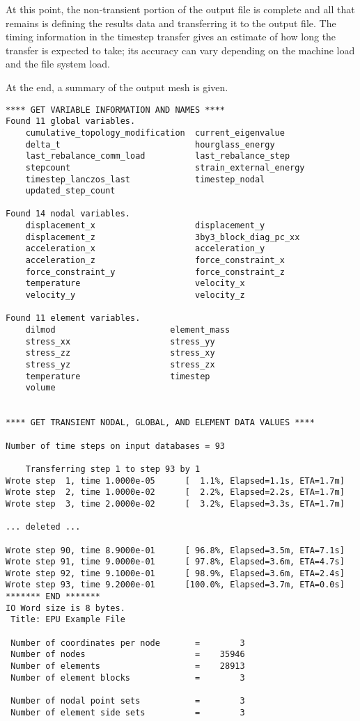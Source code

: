 \sectionline
At this point, the non-transient portion of the output file is
complete and all that remains is defining the results data and
transferring it to the output file.  The timing information in the
timestep transfer gives an estimate of how long the transfer is
expected to take; its accuracy can vary depending on the machine load
and the file system load.

At the end, a summary of the output mesh is given.

\begin{verbatim}
**** GET VARIABLE INFORMATION AND NAMES ****
Found 11 global variables.
	cumulative_topology_modification  current_eigenvalue
	delta_t                           hourglass_energy
	last_rebalance_comm_load          last_rebalance_step
	stepcount                         strain_external_energy
	timestep_lanczos_last             timestep_nodal
	updated_step_count

Found 14 nodal variables.
	displacement_x                    displacement_y
	displacement_z                    3by3_block_diag_pc_xx
	acceleration_x                    acceleration_y
	acceleration_z                    force_constraint_x
	force_constraint_y                force_constraint_z
	temperature                       velocity_x
	velocity_y                        velocity_z

Found 11 element variables.
	dilmod                       element_mass
	stress_xx                    stress_yy
	stress_zz                    stress_xy
	stress_yz                    stress_zx
	temperature                  timestep
	volume


**** GET TRANSIENT NODAL, GLOBAL, AND ELEMENT DATA VALUES ****

Number of time steps on input databases = 93

	Transferring step 1 to step 93 by 1
Wrote step  1, time 1.0000e-05		[  1.1%, Elapsed=1.1s, ETA=1.7m]
Wrote step  2, time 1.0000e-02		[  2.2%, Elapsed=2.2s, ETA=1.7m]
Wrote step  3, time 2.0000e-02		[  3.2%, Elapsed=3.3s, ETA=1.7m]

... deleted ...

Wrote step 90, time 8.9000e-01		[ 96.8%, Elapsed=3.5m, ETA=7.1s]
Wrote step 91, time 9.0000e-01		[ 97.8%, Elapsed=3.6m, ETA=4.7s]
Wrote step 92, time 9.1000e-01		[ 98.9%, Elapsed=3.6m, ETA=2.4s]
Wrote step 93, time 9.2000e-01		[100.0%, Elapsed=3.7m, ETA=0.0s]
******* END *******
IO Word size is 8 bytes.
 Title: EPU Example File

 Number of coordinates per node       =        3
 Number of nodes                      =    35946
 Number of elements                   =    28913
 Number of element blocks             =        3

 Number of nodal point sets           =        3
 Number of element side sets          =        3
\end{verbatim}
